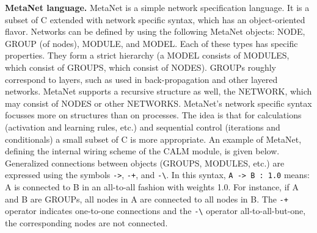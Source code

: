 \documentclass[11pt, a4paper]{article}
\begin{document}
\textbf{MetaNet language.} MetaNet is a simple network specification language. It is a subset of C extended with network specific syntax, which has an object-oriented flavor. Networks can be defined by using the following MetaNet objects: NODE, GROUP (of nodes), MODULE, and MODEL. Each of these types has specific properties. They form a strict hierarchy (a MODEL consists of MODULES, which consist of GROUPS, which consist of NODES). GROUPs roughly correspond to layers, such as used in back-propagation and other layered networks. MetaNet supports a recursive structure as well, the NETWORK, which may consist of NODES or other NETWORKS. MetaNet's network specific syntax focusses more on structures than on processes. The idea is that for calculations (activation and learning rules, etc.) and sequential control (iterations and conditionals) a small subset of C is more appropriate. An example of MetaNet, defining the internal wiring scheme of the CALM module, is given below. Generalized connections between objects (GROUPS, MODULES, etc.) are expressed using the symbols \texttt{->}, \texttt{-+}, and \texttt{-\textbackslash}. In this syntax, \texttt{A -> B : 1.0} means: A is connected to B in an all-to-all fashion with weights 1.0. For instance, if A and B are GROUPs, all nodes in A are connected to all nodes in B. The \texttt{-+} operator indicates one-to-one connections and the \texttt{-\textbackslash} operator all-to-all-but-one, the corresponding nodes are not connected.
\end{document}
